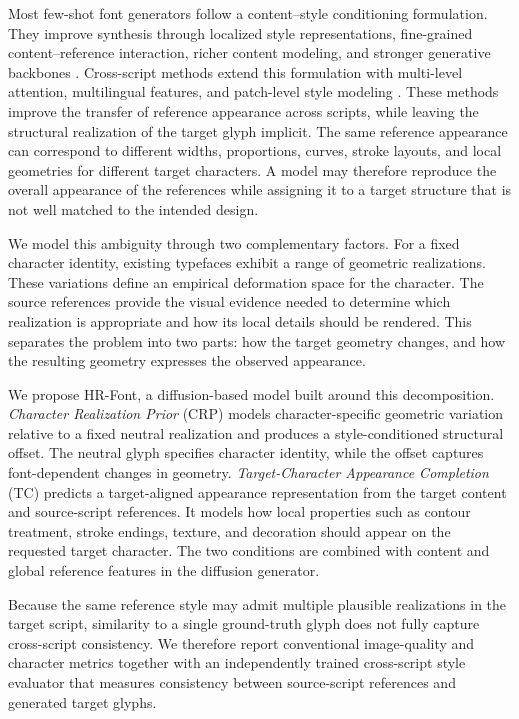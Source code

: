 \documentclass{article}
\begin{document}
Most few-shot font generators follow a content--style conditioning formulation.
They improve synthesis through localized style representations, fine-grained content--reference interaction, richer content modeling, and stronger generative backbones
\citep{park2021lffont,park2021mxfont,tang2022fsfont,wang2023cffont,yang2024fontdiffuser}.
Cross-script methods extend this formulation with multi-level attention, multilingual features, and patch-level style modeling
\citep{li2021ftransgan,zhang2022mfnet,zhao2024fcagan,zeng2026rpfont,yan2026daafont}.
These methods improve the transfer of reference appearance across scripts, while leaving the structural realization of the target glyph implicit.
The same reference appearance can correspond to different widths, proportions, curves, stroke layouts, and local geometries for different target characters.
A model may therefore reproduce the overall appearance of the references while assigning it to a target structure that is not well matched to the intended design.

We model this ambiguity through two complementary factors.
For a fixed character identity, existing typefaces exhibit a range of geometric realizations.
These variations define an empirical deformation space for the character.
The source references provide the visual evidence needed to determine which realization is appropriate and how its local details should be rendered.
This separates the problem into two parts: how the target geometry changes, and how the resulting geometry expresses the observed appearance.

We propose HR-Font, a diffusion-based model built around this decomposition.
\emph{Character Realization Prior} (CRP) models character-specific geometric variation relative to a fixed neutral realization and produces a style-conditioned structural offset.
The neutral glyph specifies character identity, while the offset captures font-dependent changes in geometry.
\emph{Target-Character Appearance Completion} (TC) predicts a target-aligned appearance representation from the target content and source-script references.
It models how local properties such as contour treatment, stroke endings, texture, and decoration should appear on the requested target character.
The two conditions are combined with content and global reference features in the diffusion generator.

Because the same reference style may admit multiple plausible realizations in the target script, similarity to a single ground-truth glyph does not fully capture cross-script consistency.
We therefore report conventional image-quality and character metrics together with an independently trained cross-script style evaluator that measures consistency between source-script references and generated target glyphs.
\end{document}
